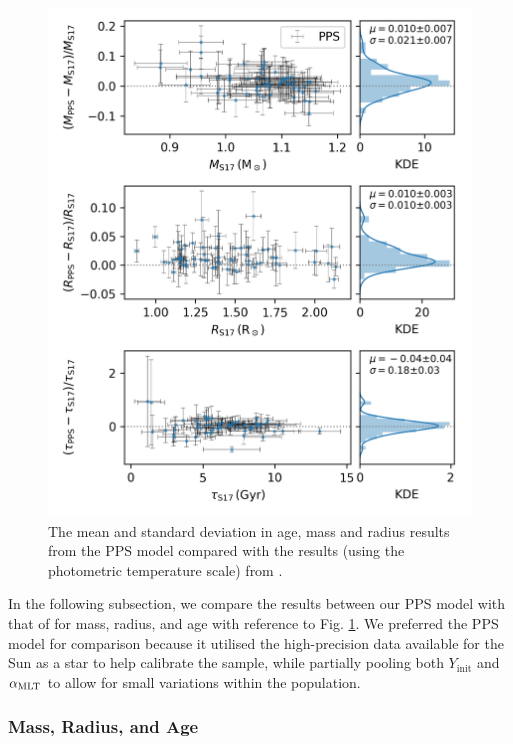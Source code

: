 \begin{figure}[!tb]
    \centering
    \includegraphics{figures/param-comp.png}
    \caption[The mean and standard deviation in age, mass and radius results from the PPS model.]{The mean and standard deviation in age, mass and radius results from the PPS model compared with the results (using the photometric temperature scale) from .}
    \label{fig:comp}
\end{figure}

In the following subsection, we compare the results between our PPS model with that of  for mass, radius, and age with reference to Fig. \ref{fig:comp}. We preferred the PPS model for comparison because it utilised the high-precision data available for the Sun as a star to help calibrate the sample, while partially pooling both $Y_\mathrm{init}$ and ${\alpha_\mathrm{MLT}}$ to allow for small variations within the population.

\subsubsection{Mass, Radius, and Age}

